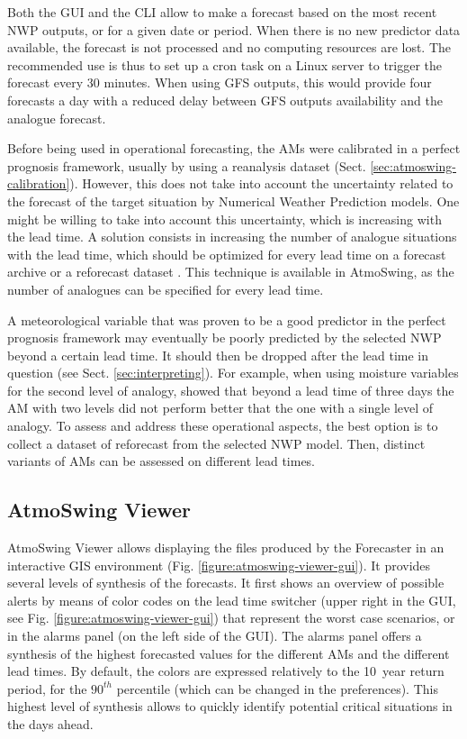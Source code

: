 \documentclass[review]{elsarticle}
\begin{document}
Both the GUI and the CLI allow to make a forecast based on the most recent NWP outputs, or for a given date or period. When there is no new predictor data available, the forecast is not processed and no computing resources are lost. The recommended use is thus to set up a cron task on a Linux server to trigger the forecast every 30 minutes. When using GFS outputs, this would provide four forecasts a day with a reduced delay between GFS outputs availability and the analogue forecast.

Before being used in operational forecasting, the AMs were calibrated in a perfect prognosis framework, usually by using a reanalysis dataset (Sect. \ref{sec:atmoswing-calibration}). However, this does not take into account the uncertainty related to the forecast of the target situation by Numerical Weather Prediction models. One might be willing to take into account this uncertainty, which is increasing with the lead time. A solution consists in increasing the number of analogue situations with the lead time, which should be optimized for every lead time on a forecast archive or a reforecast dataset \citep{Thevenot2004}. This technique is available in AtmoSwing, as the number of analogues can be specified for every lead time.

A meteorological variable that was proven to be a good predictor in the perfect prognosis framework may eventually be poorly predicted by the selected NWP beyond a certain lead time. It should then be dropped after the lead time in question (see Sect. \ref{sec:interpreting}). For example, when using moisture variables for the second level of analogy, \citet{Thevenot2004} showed that beyond a lead time of three days the AM with two levels did not perform better that the one with a single level of analogy. To assess and address these operational aspects, the best option is to collect a dataset of reforecast from the selected NWP model. Then, distinct variants of AMs can be assessed on different lead times. 


\subsection{AtmoSwing Viewer}
\label{sec:viewer}

AtmoSwing Viewer allows displaying the files produced by the Forecaster in an interactive GIS environment (Fig. \ref{figure:atmoswing-viewer-gui}). It provides several levels of synthesis of the forecasts. It first shows an overview of possible alerts by means of color codes on the lead time switcher (upper right in the GUI, see Fig. \ref{figure:atmoswing-viewer-gui}) that represent the worst case scenarios, or in the alarms panel (on the left side of the GUI). The alarms panel offers a synthesis of the highest forecasted values for the different AMs and the different lead times. By default, the colors are expressed relatively to the 10~year return period, for the $90^{th}$ percentile (which can be changed in the preferences). This highest level of synthesis allows to quickly identify potential critical situations in the days ahead.
\end{document}
